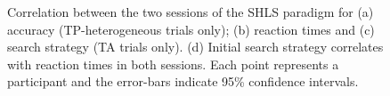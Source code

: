 \documentclass[Afour, sageapa, times]{sagej}
\begin{document}
\begin{figure}
\centering
{}
\caption{Correlation between the two sessions of the SHLS paradigm for (a)  accuracy (TP-heterogeneous trials only); (b) reaction times and (c) search strategy (TA trials only). (d) Initial search strategy correlates with reaction times in both sessions. Each point represents a participant and the error-bars indicate 95\% confidence intervals.}
\label{fig:splithalf_summary}
\end{figure}
\end{document}
